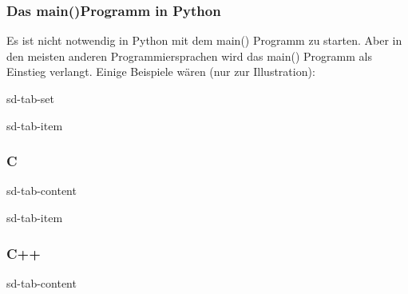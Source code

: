 \documentclass[letterpaper,10pt,english]{jupyterBook}
\begin{document}
\subsubsection*{Das main()\sphinxhyphen{}Programm in Python}

\sphinxAtStartPar
Es ist nicht notwendig in Python mit dem main() Programm zu starten. Aber in den meisten anderen Programmiersprachen wird das main() Programm als Einstieg verlangt. Einige Beispiele wären (nur zur Illustration):

\begin{sphinxuseclass}{sd-tab-set}
\begin{sphinxuseclass}{sd-tab-item}\subsubsection*{C}

\begin{sphinxuseclass}{sd-tab-content}
\begin{sphinxVerbatim}[commandchars=\\\{\}]

\end{sphinxVerbatim}

\end{sphinxuseclass}
\end{sphinxuseclass}
\begin{sphinxuseclass}{sd-tab-item}\subsubsection*{C++}

\begin{sphinxuseclass}{sd-tab-content}
\begin{sphinxVerbatim}[commandchars=\\\{\}]

\end{sphinxVerbatim}


\end{sphinxuseclass}
\end{sphinxuseclass}
\end{sphinxuseclass}
\end{document}
